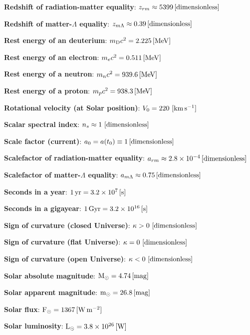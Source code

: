 \documentclass[a4paper,11pt]{article}
\begin{document}
{\noindent}\textbf{Redshift of radiation-matter equality}: $z_{rm} \approx 5399\,[{\rm dimensionless}]$

{\noindent}\textbf{Redshift of matter-$\Lambda$ equality}: $z_{m\Lambda}
\approx0.39\,[{\rm dimensionless}]$

{\noindent}\textbf{Rest energy of an deuterium}: $m_\mathrm{D}c^2 = 2.225\,[{\rm MeV}]$

{\noindent}\textbf{Rest energy of an electron}: $m_ec^2 = 0.511\,[{\rm MeV}]$

{\noindent}\textbf{Rest energy of a neutron}: $m_nc^2 = 939.6\,[{\rm MeV}]$

{\noindent}\textbf{Rest energy of a proton}: $m_pc^2 = 938.3\,[{\rm MeV}]$

{\noindent}\textbf{Rotational velocity (at Solar position)}: $V_0 = 220 ~ [{\rm km\,s^{-1}}]$

{\noindent}\textbf{Scalar spectral index}: $n_s\approx1 ~ [{\rm dimensionless}]$

{\noindent}\textbf{Scale factor (current)}: $a_0=a(t_0)\equiv1\,[{\rm dimensionless}]$

{\noindent}\textbf{Scalefactor of radiation-matter equality}: $a_{rm} \approx 2.8\times10^{-4}\,[{\rm dimensionless}]$

{\noindent}\textbf{Scalefactor of matter-$\Lambda$ equality}: $a_{m\Lambda}
\approx0.75\,[{\rm dimensionless}]$

{\noindent}\textbf{Seconds in a year}: $1\,{\rm yr} = 3.2\times10^7\,[{\rm s}]$

{\noindent}\textbf{Seconds in a gigayear}: $1\,{\rm Gyr} = 3.2\times10^{16}\,[{\rm s}]$

{\noindent}\textbf{Sign of curvature (closed Universe)}: $\kappa>0 ~ [{\rm dimensionless}]$

{\noindent}\textbf{Sign of curvature (flat Universe)}: $\kappa=0 ~ [{\rm dimensionless}]$

{\noindent}\textbf{Sign of curvature (open Universe)}: $\kappa<0 ~ [{\rm dimensionless}]$

{\noindent}\textbf{Solar absolute magnitude}: ${\rm M}_\odot = 4.74\,[{\rm mag}]$

{\noindent}\textbf{Solar apparent magnitude}: ${\rm m}_\odot = 26.8\,[{\rm mag}]$

{\noindent}\textbf{Solar flux}: ${\rm F}_\odot = 1367\,[{\rm W\,m^{-2}}]$

{\noindent}\textbf{Solar luminosity}: ${\rm L}_\odot = 3.8\times10^{26}\,[{\rm W}]$
\end{document}
